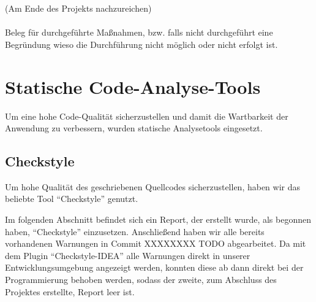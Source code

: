 
    (Am Ende des Projekts nachzureichen)\\\\
    Beleg für durchgeführte Maßnahmen, bzw. falls nicht durchgeführt eine Begründung wieso die Durchführung nicht möglich oder nicht erfolgt ist. \\



\clearpage


\section{Statische Code-Analyse-Tools}

Um eine hohe Code-Qualität sicherzustellen und damit die Wartbarkeit der
Anwendung zu verbessern, wurden statische Analysetools eingesetzt.

\clearpage
\subsection{Checkstyle}

Um hohe Qualität des geschriebenen Quellcodes sicherzustellen, haben wir das beliebte Tool ``Checkstyle'' genutzt.

Im folgenden Abschnitt befindet sich ein Report, der erstellt wurde, als begonnen haben, ``Checkstyle'' einzusetzen. Anschließend haben wir alle bereits vorhandenen Warnungen in Commit XXXXXXXX TODO abgearbeitet. Da mit dem Plugin ``Checkstyle-IDEA'' alle Warnungen direkt in unserer Entwicklungsumgebung angezeigt werden, konnten diese ab dann direkt bei der Programmierung behoben werden, sodass der zweite, zum Abschluss des Projektes erstellte, Report leer ist.









